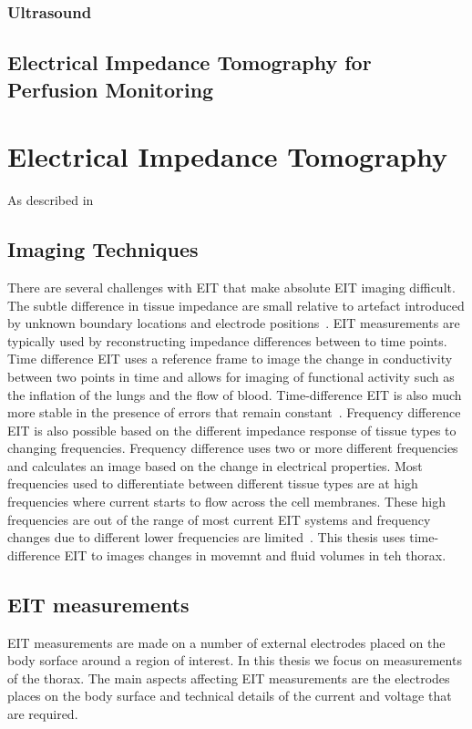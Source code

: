 \subsubsection{Ultrasound}
\subsection{Electrical Impedance Tomography for Perfusion Monitoring}

\section{Electrical Impedance Tomography}
As described in  

\subsection{Imaging Techniques}
There are several challenges with EIT that make absolute EIT imaging difficult. 
The subtle difference in tissue impedance are small relative to artefact introduced 
by unknown boundary locations and electrode 
positions~\parencite{adler_why_2015,adler_electrical_2017,nissinen_compensation_2009}. 
EIT measurements are typically used by 
reconstructing impedance differences between to time points.
Time difference EIT uses a reference frame to image the change in conductivity between 
two points in time and allows for imaging of functional activity such as the inflation of the lungs 
and the flow of blood.
Time-difference EIT is also much more stable in the presence of errors that remain 
constant~\parencite{brown_electrical_2003,adler_electrical_2017}.
Frequency difference EIT is also possible based on the different impedance response 
of tissue types to changing frequencies. Frequency difference uses 
two or more different frequencies and calculates an image based on the change in electrical properties.
Most frequencies used to differentiate between different tissue types are at high frequencies 
where current starts to flow across the cell membranes. 
These high frequencies are out of the range of most current EIT systems and 
frequency changes due to different lower frequencies are limited~\parencite{adler_electrical_2017}.
This thesis uses time-difference EIT to images changes in movemnt and fluid volumes in teh thorax.

\subsection{EIT measurements}
EIT measurements are made on a number of external electrodes placed on the body sorface around
a region of interest. In this thesis we focus on measurements of the thorax. The main aspects
affecting EIT measurements are the electrodes places on the body surface and technical details 
of the current and voltage that are required. 
